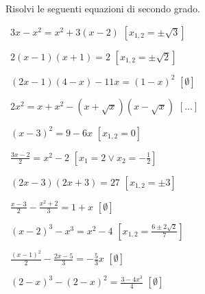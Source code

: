 \begin{esercizio}[\Ast]
\label{ese:3.25}
Risolvi le seguenti equazioni di secondo grado.
\begin{multicols}{2}
 \begin{enumeratea}
 \item~$3 x-x^{2} = x^{2} + 3 (x-2)$
  \hfill$\left[x_{1,2} = \pm \sqrt{3}\right]$
 \item~$2 (x-1) (x + 1) = 2$
  \hfill$\left[x_{1,2} =\pm \sqrt{2}\right]$
 \item~$(2 x-1) (4-x)-11 x = (1-x)^{2}$
  \hfill$\left[\emptyset\right]$
 \item~$2x^{2} = x + x^{2}-(x + \sqrt{x}) (x-\sqrt{x})$
  \hfill$\left[...\right]$
 \item~$(x-3)^{2} = 9-6 x$
  \hfill$\left[x_{1,2}= 0\right]$
 \item~$\frac{3 x-2}{2} = x^{2}-2$
  \hfill$\left[x_{1} = 2 \vee x_{2} =-\frac{1}{2}\right]$
 \item~$(2 x-3) (2 x + 3) = 27$
  \hfill$\left[x_{1,2} =\pm 3\right]$
 \item~$\frac{x-3}{2}-\frac{x^{2} + 2}{3} = 1 + x$
  \hfill$\left[\emptyset\right]$
 \item~$(x-2)^{3}-x^{3} = x^{2}-4$
  \hfill$\left[x_{1,2} = \frac{6 \pm 2 \sqrt{2}}{7}\right]$
 \item~$\frac{(x-1)^{2}}{2}-\frac{2 x-5}{3} =-\frac{5}{3} x$
  \hfill$\left[\emptyset\right]$
 \item~$(2-x)^{3}-(2-x)^{2} = \frac{3-4 x^{3}}{4}$
  \hfill$\left[\emptyset\right]$
 \end{enumeratea}
 \end{multicols}
\end{esercizio}

